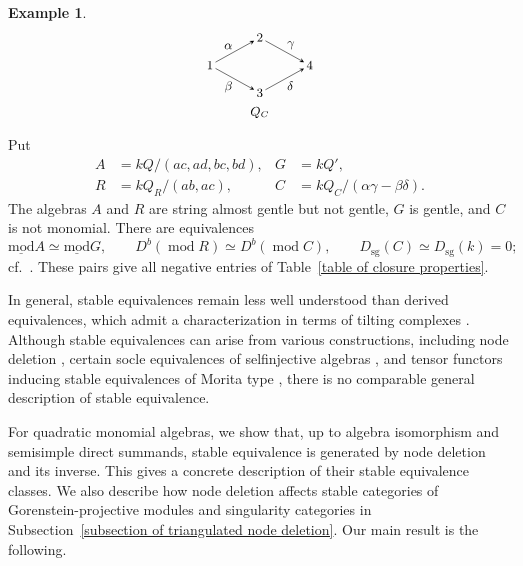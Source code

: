 \documentclass[11pt]{article}
\renewcommand{\mod}{\operatorname{mod}}
\newcommand{\smod}{\operatorname{\underline{mod}}}
\theoremstyle{definition}
\newtheorem{example}[theorem]{Example}
\begin{document}
\begin{example}
\[\begin{tikzpicture}[
				x=1cm,y=1cm,font=\small,>=stealth,
				every node/.style={inner sep=1.5pt}
				]
				\begin{scope}[xshift=10.2cm]
					\node (u) at (0,0) {$1$};
					\node (v1) at (1.25,.7) {$2$};
					\node (v2) at (1.25,-.7) {$3$};
					\node (w) at (2.5,0) {$4$};
					\draw[->] (u)--node[above left] {$\alpha$}(v1);
					\draw[->] (u)--node[below left] {$\beta$}(v2);
					\draw[->] (v1)--node[above right] {$\gamma$}(w);
					\draw[->] (v2)--node[below right] {$\delta$}(w);
					\node at (1.25,-1.2) {$Q_C$};
				\end{scope}
			\end{tikzpicture}
		\]
		Put
		\[
			\begin{aligned}
				A&=kQ/(ac,ad,bc,bd),&
				G&=kQ',\\
				R&=kQ_R/(ab,ac),&
				C&=kQ_C/(\alpha\gamma-\beta\delta).
			\end{aligned}
		\]
		The algebras $A$ and $R$ are string almost gentle but not gentle, $G$ is gentle, and $C$ is not monomial.
		There are equivalences
		\[
			\smod A\simeq\smod G,\qquad
			D^b(\mod R)\simeq D^b(\mod C),\qquad
			D_{\mathrm{sg}}(C)\simeq D_{\mathrm{sg}}(k)=0;
		\]
		cf.~\cite{Mar80,Kel07}.
		These pairs give all negative entries of Table~\ref{table of closure properties}.
	\end{example}


	In general, stable equivalences remain less well understood than derived equivalences, which admit a characterization in terms of tilting complexes \cite{Ric89,Kel94}.
	Although stable equivalences can arise from various constructions, including node deletion \cite{Mar80}, certain socle equivalences of selfinjective algebras \cite{Ohn02}, and tensor functors inducing stable equivalences of Morita type \cite{Bro94}, there is no comparable general description of stable equivalence.

	For quadratic monomial algebras, we show that, up to algebra isomorphism and semisimple direct summands, stable equivalence is generated by node deletion and its inverse. This gives a concrete description of their stable equivalence classes. We also describe how node deletion affects stable categories of Gorenstein-projective modules and singularity categories in Subsection~\ref{subsection of triangulated node deletion}. Our main result is the following.
\end{document}
